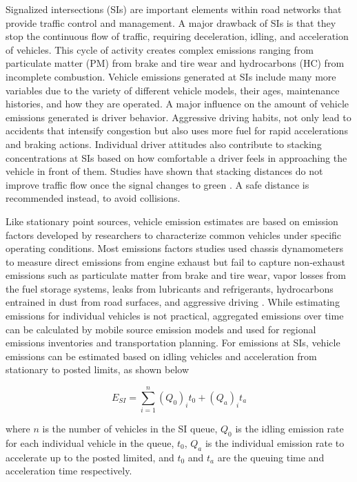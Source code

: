 Signalized intersections (SIs) are important elements within road networks that provide traffic control and management. A major drawback of SIs is that they stop the continuous flow of traffic, requiring deceleration, idling, and acceleration of vehicles. This cycle of activity creates complex emissions ranging from particulate matter (PM) from brake and tire wear and hydrocarbons (HC) from incomplete combustion. Vehicle emissions generated at SIs include many more variables due to the variety of different vehicle models, their ages, maintenance histories, and how they are operated. A major influence on the amount of vehicle emissions generated is driver behavior. Aggressive driving habits, not only lead to accidents that intensify congestion but also uses more fuel for rapid accelerations and braking actions. Individual driver attitudes also contribute to stacking concentrations at SIs based on how comfortable a driver feels in approaching the vehicle in front of them. Studies have shown that stacking distances do not improve traffic flow once the signal changes to green  \citep{Ahmadi2017}. A safe distance is recommended instead, to avoid collisions.

Like stationary point sources, vehicle emission estimates are based on emission factors developed by researchers to characterize common vehicles under specific operating conditions. Most emissions factors studies used chassis dynamometers to measure direct emissions from engine exhaust but fail to capture non-exhaust emissions such as particulate matter from brake and tire wear, vapor losses from the fuel storage systems, leaks from lubricants and refrigerants, hydrocarbons entrained in dust from road surfaces, and aggressive driving \citep{Kam2012, Franco2013, Freeman2015a}. While estimating emissions for individual vehicles is not practical, aggregated emissions over time can be calculated by mobile source emission models and used for regional emissions inventories and transportation planning. For emissions at SIs, vehicle emissions can be estimated based on idling vehicles and acceleration from stationary to posted limits, as shown below

\begin{equation}
\label{eq:siemissions}
E_{SI}=\sum_{i=1}^{n}(Q_{0})_{i}t_{0} + (Q_{a})_{i}t_{a}
\end{equation}

\noindent
where $n$ is the number of vehicles in the SI queue, $Q_{0}$ is the idling emission rate for each individual vehicle in the queue, $t_{0}$,  $Q_{a}$ is the individual emission rate to accelerate up to the posted limited, and $t_{0}$   and $t_{a}$ are the queuing time and acceleration time respectively.

